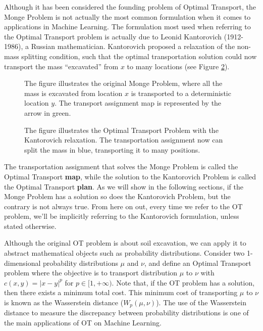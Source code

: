 Although it has been considered the founding problem of Optimal Transport, the Monge Problem is not actually the most
common formulation when it comes to applications in Machine Learning. The formulation most used when referring
to the Optimal Transport problem is actually due to Leonid Kantorovich (1912-1986), a Russian mathematician.
Kantorovich proposed a relaxation of the non-mass splitting condition, such that the optimal transportation
solution could now transport the mass ``excavated'' from $x$ to many locations
(see Figure \ref{fig:kantorovichproblem}).

\begin{figure}[H]
  \centering
  \def\svgscale{0.7}
  
  \caption{The figure illustrates the original Monge Problem, where all the mass is excavated from location
  $x$ is transported to a deterministic location $y$. The transport assignment map is represented by the arrow in green.}
  \label{fig:mongeproblem}
\end{figure}

\begin{figure}[H]
  \centering
  \def\svgscale{0.7}
  
  \caption{The figure illustrates the Optimal Transport Problem with the Kantorovich relaxation.
  The transportation assignment now can split the mass in blue, transporting it to many positions.}
  \label{fig:kantorovichproblem}
\end{figure}

The transportation assignment that solves the Monge Problem is called the Optimal Transport \textbf{map},
while the solution to the Kantorovich Problem is called the Optimal Transport \textbf{plan}. As we will show
in the following sections, if the Monge Problem has a solution so does the Kantorovich Problem,
but the contrary is not always true. From here
on out, every time we refer to the OT problem, we'll be implicitly referring to the Kantorovich formulation, unless
stated otherwise.

Although the original OT problem is about soil excavation, we can apply it to abstract mathematical objects
such as probability distributions. Consider two 1-dimensional probability distributions
$\mu$ and $\nu$, and define an Optimal Transport problem where the objective is to transport
distribution $\mu$ to $\nu$ with $c(x,y) = |x-y|^p$ for $p \in [1,+\infty)$.
Note that, if the OT problem has a solution, then there exists a minimum total cost. This minimum
cost of transporting $\mu$ to $\nu$ is known as the Wasserstein distance ($W_p(\mu,\nu)$).
The use of the Wasserstein distance to measure the discrepancy between probability distributions
is one of the main applications of OT on Machine Learning.

